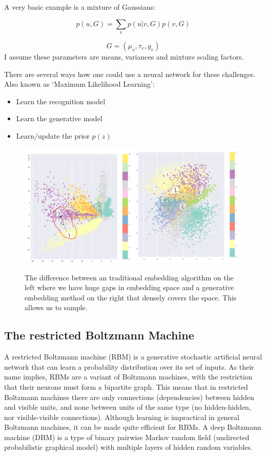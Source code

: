 \documentclass[main]{subfiles}
\begin{document}
A very basic example is a mixture of Gaussians:

\begin{equation}
    p(u,G) = \sum_v p(u|v,G)p(v,G)
\end{equation}

\begin{equation}
    G = (\mu_v, \tau_v, y_v)
\end{equation}
I assume these parameters are means, variances and mixture scaling factors.

There are several ways how one could use a neural network for these challenges. Also known as ‘Maximum Likelihood Learning’:
\begin{itemize}
    \item Learn the recognition model
    \item Learn the generative model
    \item Learn/update the prior $p(z)$
\end{itemize}

\begin{figure}[H]
	\centering
	\includegraphics[width=0.9\linewidth]{07_UnsupervisedAndSelfsupervisedLearning/figures/generative-vs-trad-embed.png}
	\label{fig:generative-vs-trad-embed}
	\caption{The difference between an traditional embedding algorithm on the left where we have huge gaps in embedding space and a generative embedding method on the right that densely covers the space. This allows us to sample.}
\end{figure}

\subsection{The restricted Boltzmann Machine}
A restricted Boltzmann machine (RBM) is a generative stochastic artificial neural network that can learn a probability distribution over its set of inputs. As their name implies, RBMs are a variant of Boltzmann machines, with the restriction that their neurons must form a bipartite graph. This means that in restricted Boltzmann machines there are only connections (dependencies) between hidden and visible units, and none between units of the same type (no hidden-hidden, nor visible-visible connections). Although learning is impractical in general Boltzmann machines, it can be made quite efficient for RBMs. A deep Boltzmann machine (DBM) is a type of binary pairwise Markov random field (undirected probabilistic graphical model) with multiple layers of hidden random variables.
\end{document}
